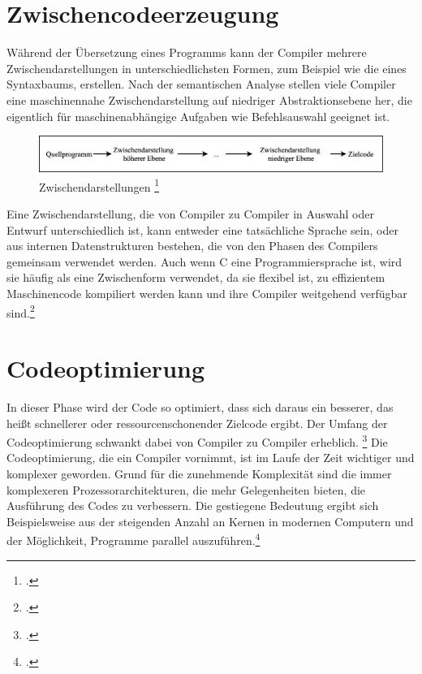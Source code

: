 \section{Zwischencodeerzeugung}
Während der Übersetzung eines Programms  kann der Compiler mehrere Zwischendarstellungen in unterschiedlichsten Formen,  zum Beispiel wie die eines Syntaxbaums, erstellen.  
Nach der semantischen Analyse stellen viele Compiler eine maschinennahe Zwischendarstellung auf niedriger Abstraktionsebene her, die eigentlich für maschinenabhängige Aufgaben wie Befehlsauswahl geeignet ist. 
\begin{figure}[!ht]
 \includegraphics[width=\textwidth,keepaspectratio]{Images/Compiler/Zwischendarstellungen.png}
 \caption[Zwischendarstellungen]{Zwischendarstellungen \protect\footcite{Ullmann2008} }
 \label{fig:Zwischendarstellung}
\end{figure}
Eine Zwischendarstellung, die von Compiler zu Compiler in Auswahl oder Entwurf unterschiedlich ist,  kann entweder eine tatsächliche Sprache sein,  oder aus internen Datenstrukturen bestehen, die von den Phasen des Compilers gemeinsam verwendet werden. Auch wenn C eine Programmiersprache ist, wird sie häufig als eine Zwischenform verwendet, da sie flexibel ist, zu effizientem Maschinencode kompiliert werden kann und ihre Compiler weitgehend verfügbar sind.\footcite[Vgl.][S. 433]{Ullmann2008}


\section{Codeoptimierung}
In dieser Phase wird der Code so optimiert, dass sich daraus ein besserer,  das heißt schnellerer oder ressourcenschonender Zielcode ergibt.  Der Umfang der Codeoptimierung schwankt dabei von Compiler zu Compiler erheblich.  \footcite[Vgl.][S. 11f]{Ullmann2008} 
Die Codeoptimierung, die ein Compiler vornimmt, ist im Laufe der Zeit wichtiger und  komplexer geworden. Grund für die zunehmende Komplexität sind die immer komplexeren Prozessorarchitekturen, die mehr Gelegenheiten bieten, die Ausführung des  Codes zu verbessern. Die gestiegene Bedeutung ergibt sich Beispielsweise aus der steigenden Anzahl an Kernen in modernen Computern und der Möglichkeit, Programme parallel auszuführen.\footcite[Vgl.][S. 20]{Ullmann2008}

